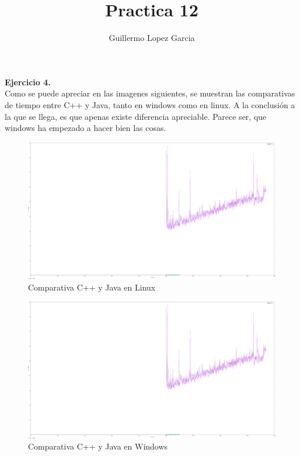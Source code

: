 \documentclass[]{article}
\title{Practica 12}
\author{Guillermo Lopez Garcia}
\begin{document}
\maketitle

\textbf{Ejercicio 4.} \\

Como se puede apreciar en las imagenes siguientes, se muestran las comparativas de tiempo entre C++ y Java, tanto en windows
como en linux. A la conclusión a la que se llega, es que apenas existe diferencia apreciable. Parece ser, que windows ha
empezado a hacer bien las cosas.

\begin{figure}
  \includegraphics[width=\linewidth]{linux.png}
  \caption{Comparativa C++ y Java en Linux}
\label{fig:comp}
\end{figure}

\begin{figure}
  \includegraphics[width=\linewidth]{windows.png}
  \caption{Comparativa C++ y Java en Windows}
\label{fig:comp}
\end{figure}
\end{document}

